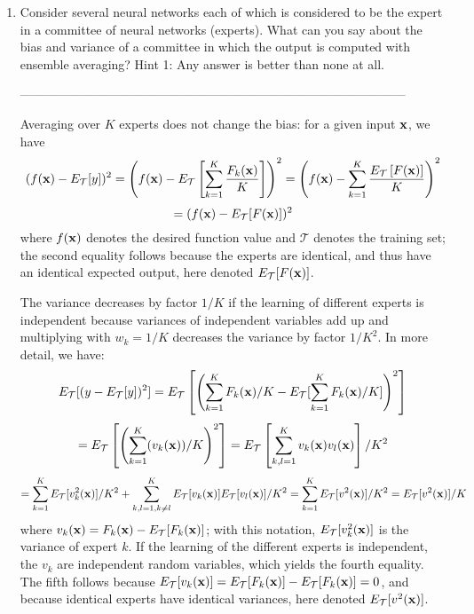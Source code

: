 \documentclass[10pt]{article}
\newcommand{\T}{\mathcal{T}}
\newcommand{\x}{{\bf x}}
\begin{document}
\begin{enumerate}
\vspace{2mm}

\vspace{2cm}
\item Consider several neural networks each of which is considered to
  be the expert in a committee of neural networks (experts).
  What can you say about the bias and variance of a committee in
  which the output is computed with ensemble averaging? Hint 1: Any
  answer is better than none at all. 

---------------------------------------------------------------------------------------------

Averaging over $K$ experts does not change the bias: for a given
input $\x$, we have
\begin{displaymath}
(f(\x)-E_{\T}[y])^2 = \left(f(\x)-E_{\T}\left[\sum_{k=1}^K \frac{F_k(\x)}{K}\right]\right)^2
= \left(f(\x)-\sum_{k=1}^K \frac{E_{\T}\left[F(\x)\right]}{K}\right)^2
\end{displaymath}
\begin{displaymath}
= (f(\x)-E_{\T}[F(\x)])^2
\end{displaymath}
  where $f(\x)$ denotes the desired function value and $\T$ denotes the training set;
  the second equality follows because the experts are identical, and thus have an
  identical expected output, here denoted $E_\T[F(\x)]$.

  The variance decreases by factor $1/K$ if the learning of different
  experts is independent  because variances of independent variables
  add up and multiplying with $w_k = 1/K$ decreases the variance by
  factor $1/K^2$. In more detail, we have:
\begin{displaymath}
E_{\T}[(y-E_{\T}[y])^2] = E_\T\left[\left(\sum_{k=1}^K F_k(\x)/K - E_\T [\sum_{k=1}^K F_k(\x)/K]\right)^2\right]
\end{displaymath}
\begin{displaymath}
= E_\T\left[\left(\sum_{k=1}^K (v_k(\x))/K\right)^2\right]
= E_\T\left[\sum_{k,l=1}^K v_k(\x) v_l(\x)\right]/K^2
\end{displaymath}
\begin{displaymath}
= \sum_{k=1}^K E_\T[ v_k^2(\x)]/K^2 + \sum_{k,l=1, k\neq l}^K E_\T[v_k(\x)] E_\T[v_l(\x)]/K^2
= \sum_{k=1}^K E_\T[v^2(\x)]/K^2 = E_\T[v^2(\x)]/K
\end{displaymath}
where $v_k(\x)=F_k(\x)-E_\T[F_k(\x)]$; with this notation,
$E_\T[v_k^2(\x)]$ is the variance of expert $k$. If the learning of
the different experts is independent, the $v_k$ are independent random
variables, which yields the fourth equality. The fifth follows because
$E_\T[v_k(\x)]=E_\T[F_k(\x)]-E_\T[F_k(\x)]=0$, and because identical
experts have identical variances, here denoted $E_\T[v^2(\x)]$.




\end{enumerate}
\end{document}
